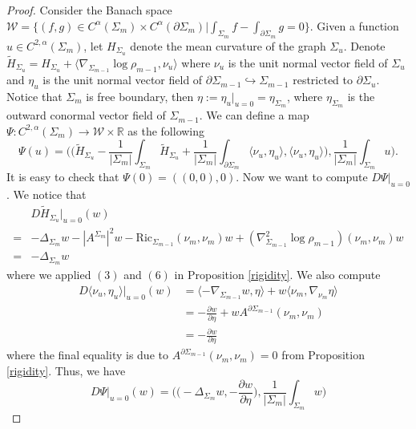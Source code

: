 \documentclass[10pt,a4paper]{amsart}
\begin{document}
\begin{proof}
    Consider the Banach space $\mathcal{W}=\{(f,g)\in C^{\alpha}(\Sigma_{m})\times C^{\alpha}(\partial \Sigma_{m})|\int_{\Sigma_{m}}f-\int_{\partial \Sigma_{m}}g=0\}$. Given a function $u\in C^{2,\alpha}(\Sigma_{m})$, let $H_{\Sigma_u}$ denote the mean curvature of the graph $\Sigma_u$. Denote $\tilde{H}_{\Sigma_{u}}=H_{\Sigma_{u}}+\langle \nabla_{\Sigma_{m-1}}\log\rho_{m-1},\nu_{u}\rangle$ where $\nu_{u}$ is the unit normal vector field of $\Sigma_{u}$ and $\eta
    _{u}$ is the unit normal vector field of $\partial \Sigma_{m-1}\hookrightarrow \Sigma_{m-1}$ restricted to $\partial \Sigma_{u}$. Notice that $\Sigma_{m}$ is free boundary, then $\eta:=\eta_{u}|_{u=0} = \eta_{\Sigma_{m}}$, where $\eta_{\Sigma_{m}}$ is the outward conormal vector field of $\Sigma_{m-1}$. We can define a map $\Psi:C^{2,\alpha}(\Sigma_{m})\rightarrow\mathcal{W}\times \mathbb{R}$ as the following
    \[
    \Psi(u)=\Big(\big(\tilde{H}_{\Sigma_{u}}-\frac{1}{|\Sigma_{m}|}\int_{\Sigma_{m}}\tilde{H}_{\Sigma_{u}}+\frac{1}{|\Sigma_{m}|}\int_{\partial\Sigma_{m}}\langle \nu_{u},\eta_{u}\rangle,\langle\nu_{u},\eta_{u}\rangle\big),\frac{1}{|\Sigma_{m}|}\int_{\Sigma_{m}}u\Big).
    \]
    It is easy to check that $\Psi(0)=((0,0),0)$. Now we want to compute $D\Psi|_{u=0}$. We notice that
    \[
    \begin{aligned}
    &D\tilde{H}_{\Sigma_{u}}|_{u=0}(w)\\
    =&-\Delta_{\Sigma_{m}}w-|A^{\Sigma_{m}}|^2w-\text{Ric}_{\Sigma_{m-1}}(\nu_{m},\nu_{m})w+(\nabla^{2}_{\Sigma_{m-1}}\log \rho_{m-1})(\nu_{m},\nu_{m})w\\
    =&-\Delta_{\Sigma_{m}}w
    \end{aligned}
    \]
    where we applied $(3)$ and $(6)$ in Proposition \ref{rigidity}. 
    We also compute 
    \[
    \begin{aligned}
    D\langle\nu_{u},\eta_{u}\rangle|_{u=0}(w) 
    &=\langle -\nabla_{\Sigma_{m-1}}w,\eta\rangle + w\langle \nu_{m},\nabla_{\nu_{m}}\eta\rangle\\
    &=-\frac{\partial w}{\partial \eta}+ wA^{\partial \Sigma_{m-1}}(\nu_{m},\nu_{m})\\
    &=-\frac{\partial w}{\partial \eta}
    \end{aligned}
    \]
    where the final equality is due to $A^{\partial \Sigma_{m-1}}(\nu_{m},\nu_{m})=0$ from Proposition \ref{rigidity}. Thus, we have
    \[
    D\Psi|_{u=0}(w) = \Big(\big(-\Delta_{\Sigma_{m}}w,-\frac{\partial w}{\partial\eta}\big),\frac{1}{|\Sigma_{m}|}\int_{\Sigma_{m}}w\Big)
\]
\end{proof}
\end{document}
